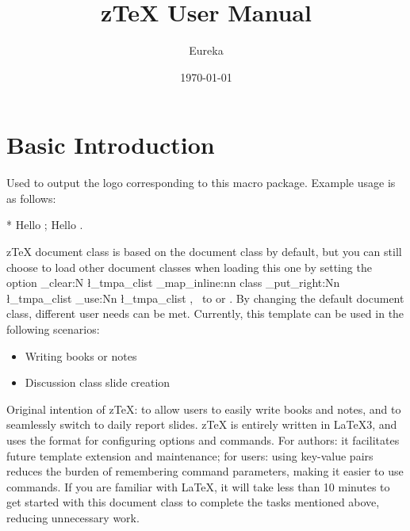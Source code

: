 \documentclass[
  hyper=true,
  class=l3doc, 
  classOption={10pt},
]{../code/ztex}
\title{z\TeX{} User Manual}
\author{Eureka}
\date{\today}
\newcommand{\zkey}[1]{
  \clist_clear:N \l_tmpa_clist
  \clist_map_inline:nn {#1}{
    \clist_put_right:Nn \l_tmpa_clist {\meta{##1}}
  }
  \clist_use:Nn \l_tmpa_clist {,~}
}
\newcounter{DocExample}
\newcommand{\ztex}{{}\lowercase{z}\TeX{}}
\let\Ozthmlang\zthmlang
\let\Ozthmnameset\zthmnameset
\let\Ozthmnew\zthmnew
\let\Ozthmstyle\zthmstyle
\let\Ozaliasopset\zaliasopset
\let\Ozthmtitleformat\zthmtitleformat
\let\Ozthmtitlebefore\zthmtitlebefore
\let\Ozthmbefore\zthmbefore
\let\Ozthmcolorset\zthmcolorset
\let\Ozthmiconset\zthmiconset
\begin{document}
\let\zthmlang\Ozthmlang
\let\zthmnameset\Ozthmnameset
\let\zthmnew\Ozthmnew
\let\zthmstyle\Ozthmstyle
\let\zaliasopset\Ozaliasopset
\let\zthmtitleformat\Ozthmtitleformat
\let\zthmtitlebefore\Ozthmtitlebefore
\let\zthmbefore\Ozthmbefore
\let\zthmcolorset\Ozthmcolorset
\let\zthmiconset\Ozthmiconset
{}
\maketitle
\restoregeometry
{}



\section{Basic Introduction}
\begin{function}[updated=2024-11-05]{\zLaTeX}
  \begin{syntax}
  \end{syntax}
  Used to output the logo corresponding to this macro package. Example usage is as follows:
\end{function}
\begin{DocExample}*
  Hello \zTeX{}; Hello \zLaTeX{}.
\end{DocExample}

\ztex{} document class is based on the  document class by default, but you can still choose to load other document classes when loading this one by setting the option \zkey{class} to 
 or . By changing the default document class, different user needs can be met. Currently, this template can be used in the following scenarios:
\begin{itemize}
  \item Writing books or notes
  \item Discussion class slide creation %
\end{itemize}

Original intention of \ztex{}: to allow users to easily write books and notes, and to seamlessly switch to daily report slides. \ztex{} is entirely written in \LaTeX3,
and uses the  format for configuring options and commands. For authors: it facilitates future template extension and maintenance; for users: using key-value pairs reduces the burden of remembering command parameters, making it easier to use commands. If you are familiar with \LaTeX{}, it will take less than 10 minutes to get started with this document class to complete the tasks mentioned above, reducing unnecessary work.
\end{document}
